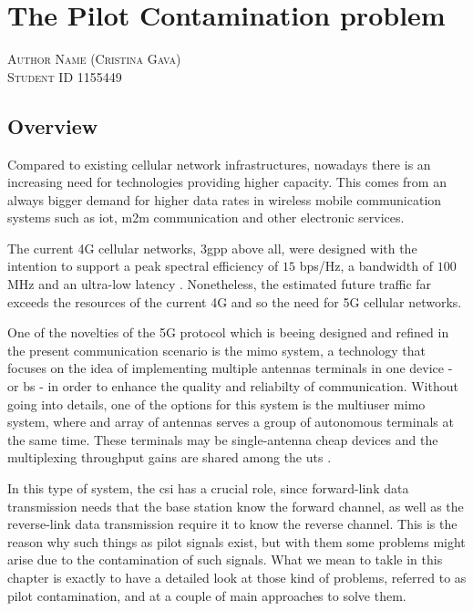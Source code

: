 \documentclass[11pt]{book}
\makeatletter
\newcommand{\chapterauthor}[1]{%
  {\parindent0pt\vspace*{-25pt}%
  \linespread{1.1} \scshape#1%
  \par\nobreak\vspace*{35pt}}
  \@afterheading%
}
\makeatother
\begin{document}
\chapter{The Pilot Contamination problem}
\chapterauthor{Author Name (Cristina Gava)\\
Student ID 1155449}

\section{Overview}
Compared to existing cellular network infrastructures, nowadays there is an increasing need for technologies providing higher capacity. This comes from an always bigger demand for higher data rates in wireless mobile communication systems such as \gls{iot}, \gls{m2m} communication and other electronic services.

The current 4G cellular networks, \gls{3gpp} above all, were designed with the intention to support a peak spectral efficiency of $15$ bps/Hz, a bandwidth of $100$ MHz and an ultra-low latency \cite{Elijah2016}. Nonetheless, the estimated future traffic far exceeds the resources of the current 4G and so the need for 5G cellular networks.

One of the novelties of the 5G protocol which is beeing designed and refined in the present communication scenario is the \gls{mimo} system, a technology that focuses on the idea of implementing multiple antennas terminals in one device - or \gls{bs} - in order to enhance the quality and reliabilty of communication. Without going into details, one of the options for this system is the multiuser \gls{mimo} system, where and array of antennas serves a group of autonomous terminals at the same time. These terminals may be single-antenna cheap devices and the multiplexing throughput gains are shared among the \gls{ut}s \cite{Marzetta2010}.

In this type of system, the \gls{csi} has a crucial role, since forward-link data transmission needs that the base station know the forward channel, as well as the reverse-link data transmission require it to know the reverse channel. This is the reason why such things as pilot signals exist, but with them some problems might arise due to the contamination of such signals. What we mean to takle in this chapter is exactly to have a detailed look at those kind of problems, referred to as pilot contamination, and at a couple of main approaches to solve them.
\end{document}
